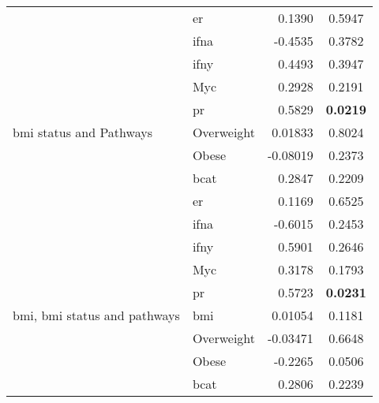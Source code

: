 \begin{table}[htpb]
\begin{threeparttable}
\begin{tabular}{llrc}
                                                                           & \gls{er}   & 0.1390    & 0.5947 \\
                                                                           & \gls{ifna} & -0.4535   & 0.3782 \\
                                                                           & \gls{ifny} & 0.4493    & 0.3947 \\
                                                                           & Myc        & 0.2928    & 0.2191 \\
                                                                           & \gls{pr}   & 0.5829    & \bfseries 0.0219  \\
				\hline
				\rule{0pt}{2.25ex}\gls{bmi} status and Pathways            & Overweight & 0.01833   & 0.8024 \\
                                                                           & Obese      & -0.08019  & 0.2373 \\
                                                                           & \gls{bcat} & 0.2847    & 0.2209 \\
                                                                           & \gls{er}   & 0.1169    & 0.6525 \\
                                                                           & \gls{ifna} & -0.6015   & 0.2453 \\
                                                                           & \gls{ifny} & 0.5901    & 0.2646 \\
                                                                           & Myc        & 0.3178    & 0.1793 \\
                                                                           & \gls{pr}   & 0.5723    & \bfseries 0.0231  \\
				\hline
				\rule{0pt}{2.25ex}\gls{bmi}, \gls{bmi} status and pathways & \gls{bmi}  & 0.01054   & 0.1181 \\
                                                                           & Overweight & -0.03471  & 0.6648 \\
                                                                           & Obese      & -0.2265   & 0.0506 \\
                                                                           & \gls{bcat} & 0.2806    & 0.2239 \\

\end{tabular}
\end{threeparttable}
\end{table}

